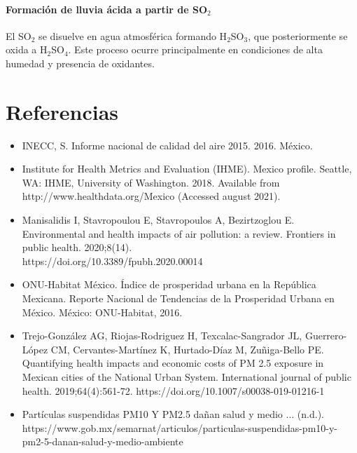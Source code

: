 \documentclass{article}
\begin{document}
    \paragraph{Formación de lluvia ácida a partir de SO$_2$}
    
    El SO$_2$ se disuelve en agua atmosférica formando H$_2$SO$_3$, que posteriormente se oxida a H$_2$SO$_4$. Este proceso ocurre principalmente en condiciones de alta humedad y presencia de oxidantes.

\section*{Referencias}

\begin{itemize}

\item INECC, S. Informe nacional de calidad del aire 2015. 2016. México.

\item Institute for Health Metrics and Evaluation (IHME). Mexico profile. Seattle, WA: IHME, University of Washington. 2018. Available from http://www.healthdata.org/Mexico (Accessed august 2021). 

\item Manisalidis I, Stavropoulou E, Stavropoulos A, Bezirtzoglou E. Environmental and health impacts of air pollution: a review. Frontiers in public health. 2020;8(14). 
\\ https://doi.org/10.3389/fpubh.2020.00014

\item ONU-Habitat México. Índice de prosperidad urbana en la República Mexicana. Reporte Nacional de Tendencias de la Prosperidad Urbana en México. México: ONU-Habitat, 2016.

\item Trejo-González AG, Riojas-Rodriguez H, Texcalac-Sangrador JL, Guerrero-López CM, Cervantes-Martínez K, Hurtado-Díaz M, Zuñiga-Bello PE. Quantifying health impacts and economic costs of PM 2.5 exposure in Mexican cities of the National Urban System. International journal of public health. 2019;64(4):561-72. https://doi.org/10.1007/s00038-019-01216-1

\item Partículas suspendidas PM10 Y PM2.5 dañan salud y medio ... (n.d.). \\
https://www.gob.mx/semarnat/articulos/particulas-suspendidas-pm10-y-pm2-5-danan-salud-y-medio-ambiente
\end{itemize}
\end{document}
